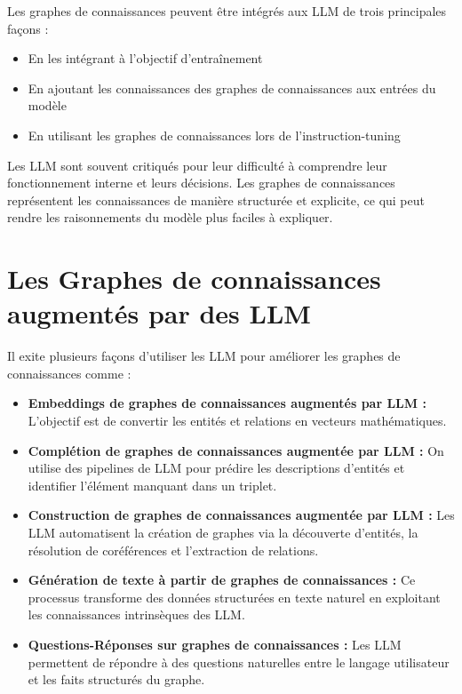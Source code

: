\documentclass[12pt,a4paper]{report}
\begin{document}
Les graphes de connaissances peuvent être intégrés aux LLM de trois principales façons :
\begin{itemize}
    \item En les intégrant à l'objectif d'entraînement
    \item En ajoutant les connaissances des graphes de connaissances aux entrées du modèle
    \item En utilisant les graphes de connaissances lors de l'instruction-tuning
\end{itemize}

Les LLM sont souvent critiqués pour leur  difficulté à comprendre leur fonctionnement interne 
et leurs décisions. Les graphes de connaissances représentent les connaissances de manière structurée et explicite, 
ce qui peut rendre les raisonnements du modèle plus faciles à expliquer.

\section{Les Graphes de connaissances augmentés par des LLM}

Il exite plusieurs façons d'utiliser les LLM pour améliorer les graphes de connaissances comme :

\begin{itemize}
    \item \textbf{Embeddings de graphes de connaissances augmentés par LLM :} L'objectif est de convertir les entités et relations en vecteurs mathématiques.
    \item \textbf{Complétion de graphes de connaissances augmentée par LLM :} On utilise des pipelines de LLM pour prédire les descriptions d'entités et identifier l'élément manquant dans un triplet.
    \item \textbf{Construction de graphes de connaissances augmentée par LLM :} Les LLM automatisent la création de graphes via la découverte d'entités, la résolution de coréférences et l'extraction de relations.
    \item \textbf{Génération de texte à partir de graphes de connaissances :} Ce processus transforme des données structurées en texte naturel en exploitant les connaissances intrinsèques des LLM.
    \item \textbf{Questions-Réponses sur graphes de connaissances :} Les LLM permettent de répondre à des questions naturelles entre le langage utilisateur et les faits structurés du graphe.
\end{itemize}
\end{document}
